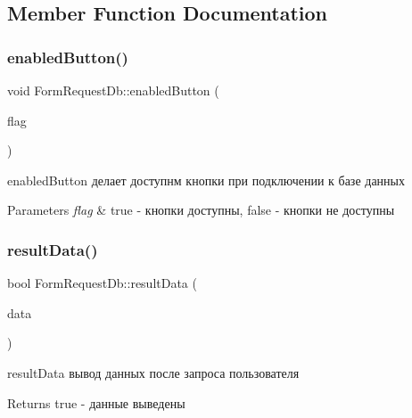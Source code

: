 \subsection{Member Function Documentation}
\mbox{\label{classFormRequestDb_ae86ba771347db116c4dc0d92b6dea2a8}} 
\subsubsection{\texorpdfstring{enabled\+Button()}{enabledButton()}}
{\footnotesize\ttfamily void Form\+Request\+Db\+::enabled\+Button (\begin{DoxyParamCaption}\item[{bool}]{flag }\end{DoxyParamCaption})}



enabled\+Button делает доступнм кнопки при подключении к базе данных 


\begin{DoxyParams}{Parameters}
{\em flag} & true -\/ кнопки доступны, false -\/ кнопки не доступны \\
\hline
\end{DoxyParams}
\mbox{\label{classFormRequestDb_a9752fbc1286338cf3fe1a9fee28ac4a7}} 
\subsubsection{\texorpdfstring{result\+Data()}{resultData()}}
{\footnotesize\ttfamily bool Form\+Request\+Db\+::result\+Data (\begin{DoxyParamCaption}\item[{const Q\+String\+List \&}]{data }\end{DoxyParamCaption})}



result\+Data вывод данных после запроса пользователя 

\begin{DoxyReturn}{Returns}
true -\/ данные выведены 
\end{DoxyReturn}
\mbox{\label{classFormRequestDb_af37eecece828d15fe8a0f2025bba6d6c}} 
